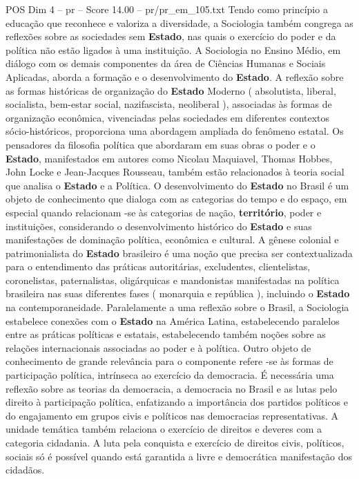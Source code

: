 \begin{textsample}{POS Dim 4 – pr – Score 14.00 – pr/pr\_em\_105.txt}
Tendo como princípio a educação que reconhece e valoriza a diversidade, a Sociologia também congrega as reflexões sobre as sociedades sem \textbf{Estado}, nas quais o exercício do poder e da política não estão ligados à uma instituição.
A Sociologia no Ensino Médio, em diálogo com os demais componentes da área de Ciências Humanas e Sociais Aplicadas, aborda a formação e o desenvolvimento do \textbf{Estado}.
A reflexão sobre as formas históricas de organização do \textbf{Estado} Moderno ( absolutista, liberal, socialista, bem-estar social, nazifascista, neoliberal ), associadas às formas de organização econômica, vivenciadas pelas sociedades em diferentes contextos sócio-históricos, proporciona uma abordagem ampliada do fenômeno estatal.
Os pensadores da filosofia política que abordaram em suas obras o poder e o \textbf{Estado}, manifestados em autores como Nicolau Maquiavel, Thomas Hobbes, John Locke e Jean-Jacques Rousseau, também estão relacionados à teoria social que analisa o \textbf{Estado} e a Política.
O desenvolvimento do \textbf{Estado} no Brasil é um objeto de conhecimento que dialoga com as categorias do tempo e do espaço, em especial quando relacionam -se às categorias de nação, \textbf{território}, poder e instituições, considerando o desenvolvimento histórico do \textbf{Estado} e suas manifestações de dominação política, econômica e cultural.
A gênese colonial e patrimonialista do \textbf{Estado} brasileiro é uma noção que precisa ser contextualizada para o entendimento das práticas autoritárias, excludentes, clientelistas, coronelistas, paternalistas, oligárquicas e mandonistas manifestadas na política brasileira nas suas diferentes fases ( monarquia e república ), incluindo o \textbf{Estado} na contemporaneidade.
Paralelamente a uma reflexão sobre o Brasil, a Sociologia estabelece conexões com o \textbf{Estado} na América Latina, estabelecendo paralelos entre as práticas políticas e estatais, estabelecendo também noções sobre as relações internacionais associadas ao poder e à política.
Outro objeto de conhecimento de grande relevância para o componente refere -se às formas de participação política, intrínseca ao exercício da democracia.
É necessária uma reflexão sobre as teorias da democracia, a democracia no Brasil e as lutas pelo direito à participação política, enfatizando a importância dos partidos políticos e do engajamento em grupos civis e políticos nas democracias representativas.
A unidade temática também relaciona o exercício de direitos e deveres com a categoria cidadania.
A luta pela conquista e exercício de direitos civis, políticos, sociais só é possível quando está garantida a livre e democrática manifestação dos cidadãos.

\end{textsample}
